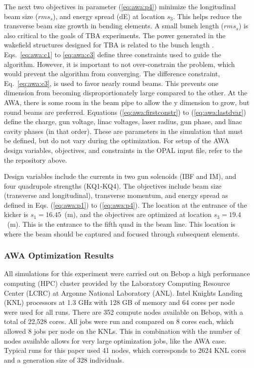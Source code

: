The next two objectives in parameter (\ref{eq:awa:p4}) minimize the 
longitudinal beam size ($rms_s$), and energy spread (dE) at location $s_3$. 
This helps reduce the transverse beam size growth in bending elements.
A small bunch length ($rms_s$) is also critical to the goals of 
TBA experiments. The power generated in the wakefield structures 
designed for TBA is related to the bunch length \cite{JING201872,PETSeq}.
Eqs.~\ref{eq:awa:c1} to \ref{eq:awa:c3} 
define three constraints used to guide the algorithm.
However, it is important to not over-constrain the problem, which would prevent
the algorithm from converging.
The difference constraint, Eq.~\ref{eq:awa:c3}, is used to favor nearly round beams.
This prevents one dimension from becoming disproportionately large compared to the other.
At the AWA, there is some room in the beam pipe to allow the y dimension to grow, but round beams are preferred.
Equations (\ref{eq:awa:firstconstr}) to
(\ref{eq:awa:lastdvar}) define the charge, gun voltage, linac voltages, 
laser radius, gun phase, and linac cavity phases (in that order). 
These are parameters in the simulation that must be defined, but do not vary during the optimization.
For setup of the AWA design variables, objectives, and constraints in the OPAL input file, 
refer to the the repository above.


Design variables include the currents in two gun solenoids (IBF and IM), 
and four quadrupole strengths (KQ1-KQ4). The objectives include
beam size (transverse and longitudinal), transverse momentum, and energy spread as
defined in Eqs. (\ref{eq:awa:p1}) to (\ref{eq:awa:p4}). 
The location at the entrance of the kicker is $s_1=16.45$~(m), 
and the objectives are optimized at location $s_3=19.4$~(m). 
This is the entrance to the fifth quad in the beam line. 
This location is where the beam should be captured and focused through subsequent elements.


\subsubsection{AWA Optimization Results}
All simulations for this experiment were carried out on Bebop a
high performance computing (HPC)
cluster provided by the Laboratory Computing Resource Center (LCRC)
at Argonne National Laboratory (ANL). Intel Knights Landing 
(KNL) processors at 1.3 GHz with 128 GB of memory 
and 64 cores per node were used for all runs. 
There are 352 compute nodes available on 
Bebop, with a total of 22,528 cores. All jobs were run and compared 
on 8 cores each, which allowed 8 jobs per node on the KNLs.
This in combination with the number of nodes available 
allows for very large optimization jobs, like the AWA case.
Typical runs for this paper used 41 nodes, which corresponds to 2624 KNL cores 
and a generation size of 328 individuals.

